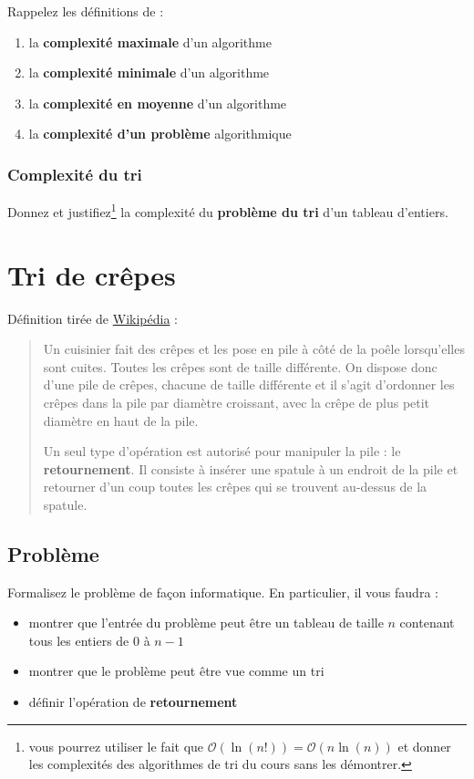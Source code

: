 \documentclass
[12pt]
{article}
\begin{document}
Rappelez les définitions de :

\begin{enumerate}
    \item la {\bf complexité maximale} d'un algorithme
    \item la {\bf complexité minimale} d'un algorithme
    \item la {\bf complexité en moyenne} d'un algorithme
    \item la {\bf complexité d'un problème} algorithmique
\end{enumerate}

\subsubsection{Complexité du tri}

Donnez et justifiez\footnote{vous pourrez utiliser le fait que $\mathcal{O}(\ln(n!)) = \mathcal{O}(n\ln(n))$ et donner les complexités des algorithmes de tri du cours sans les démontrer.} la complexité du {\bf problème du tri} d'un tableau d'entiers.


\section{Tri de crêpes}

Définition tirée de \href{https://fr.wikipedia.org/wiki/Tri_de_cr%C3%AApes#Contexte}{Wikipédia} :

\begin{verse}
Un cuisinier fait des crêpes et les pose en pile à côté de la poêle lorsqu'elles sont cuites. Toutes les crêpes sont de taille différente. On dispose donc d'une pile de crêpes, chacune de taille différente et il s'agit d'ordonner les crêpes dans la pile par diamètre croissant, avec la crêpe de plus petit diamètre en haut de la pile.

Un seul type d'opération est autorisé pour manipuler la pile : le {\bf retournement}. Il consiste à insérer une spatule à un endroit de la pile et retourner d'un coup toutes les crêpes qui se trouvent au-dessus de la spatule.   
\end{verse}

\subsection{Problème}

Formalisez le problème de façon informatique. En particulier, il vous faudra :

\begin{itemize}
    \item montrer que l'entrée du problème peut être un tableau de taille $n$ contenant tous les entiers de $0$ à $n-1$
    \item montrer que le problème peut être vue comme un tri
    \item définir l'opération de {\bf retournement}
\end{itemize}
\end{document}
